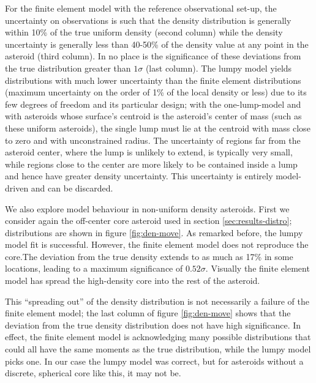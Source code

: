 \documentclass[fleqn,usenatbib]{mnras}
\begin{document}
For the finite element model with the reference observational set-up, the uncertainty on observations is such that the density distribution is generally within 10\% of the true uniform density (second column) while the density uncertainty is generally less than 40-50\% of the density value at any point in the asteroid (third column). In no place is the significance of these deviations from the true distribution greater than $1 \sigma$ (last column). The lumpy model yields distributions with much lower uncertainty than the finite element distributions (maximum uncertainty on the order of 1\% of the local density or less) due to its few degrees of freedom and its particular design; with the one-lump-model and with asteroids whose surface's centroid is the asteroid's center of mass (such as these uniform asteroids), the single lump must lie at the centroid with mass close to zero and with unconstrained radius. The uncertainty of regions far from the asteroid center, where the lump is unlikely to extend, is typically very small, while regions close to the center are more likely to be contained inside a lump and hence have greater density uncertainty. This uncertainty is entirely model-driven and can be discarded.

We also explore model behaviour in non-uniform density asteroids. First we consider again the off-center core asteroid used in section \ref{sec:results-distro}; distributions are shown in figure \ref{fig:den-move}. As remarked before, the lumpy model fit is successful. However, the finite element model does not reproduce the core.The deviation from the true density extends to as much as 17\% in some locations, leading to a maximum significance of $0.52\sigma$. Visually the finite element model has spread the high-density core into the rest of the asteroid.

This ``spreading out'' of the density distribution is not necessarily a failure of the finite element model; the last column of figure \ref{fig:den-move} shows that the deviation from the true density distribution does not have high significance. In effect, the finite element model is acknowledging many possible distributions that could all have the same moments as the true distribution, while the lumpy model picks one. In our case the lumpy model was correct, but for asteroids without a discrete, spherical core like this, it may not be.
\end{document}
